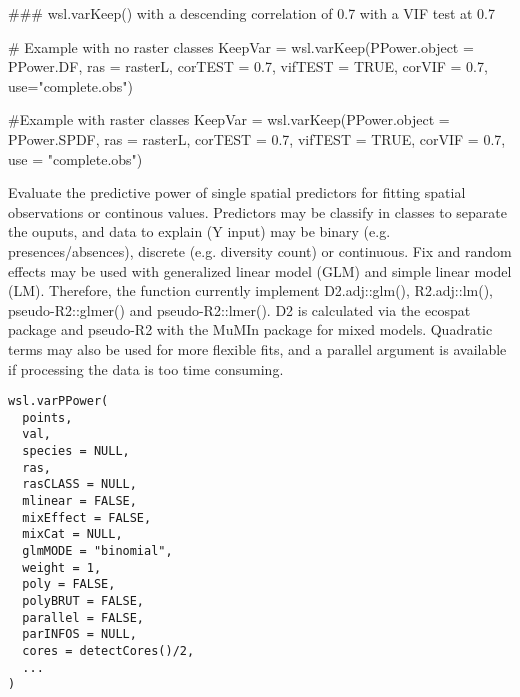 \documentclass[a4paper]{book}
\begin{document}
\begin{Examples}
\begin{ExampleCode}
 ### wsl.varKeep() with a descending correlation of 0.7 with a VIF test at 0.7

# Example with no raster classes
KeepVar = wsl.varKeep(PPower.object = PPower.DF,
                      ras = rasterL,
                      corTEST = 0.7,
                      vifTEST = TRUE,
                      corVIF = 0.7,
                      use="complete.obs")

#Example with raster classes
KeepVar = wsl.varKeep(PPower.object = PPower.SPDF,
                      ras = rasterL,
                      corTEST = 0.7,
                      vifTEST = TRUE,
                      corVIF = 0.7,
                      use = "complete.obs")

\end{ExampleCode}
\end{Examples}
%
\begin{Description}\relax
Evaluate the predictive power of single spatial predictors for fitting
spatial observations or continous values. Predictors may be classify in
classes to separate the ouputs, and data to explain (Y input) may be binary
(e.g. presences/absences), discrete (e.g. diversity count) or continuous.
Fix and random effects may be used with generalized linear model (GLM) and
simple linear model (LM). Therefore, the function currently implement
D2.adj::glm(), R2.adj::lm(), pseudo-R2::glmer() and pseudo-R2::lmer(). D2 is
calculated via the ecospat package and pseudo-R2 with the MuMIn package for mixed
models. Quadratic terms may also be used for more flexible fits, and a
parallel argument is available if processing the data is too time consuming.
\end{Description}
%
\begin{Usage}
\begin{verbatim}
wsl.varPPower(
  points,
  val,
  species = NULL,
  ras,
  rasCLASS = NULL,
  mlinear = FALSE,
  mixEffect = FALSE,
  mixCat = NULL,
  glmMODE = "binomial",
  weight = 1,
  poly = FALSE,
  polyBRUT = FALSE,
  parallel = FALSE,
  parINFOS = NULL,
  cores = detectCores()/2,
  ...
)
\end{verbatim}
\end{Usage}
%
\end{document}
